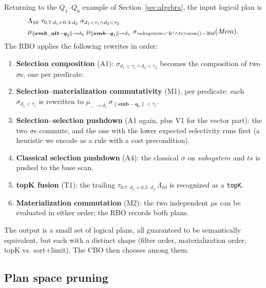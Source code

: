 \documentclass[sigconf,nonacm,review]{acmart}
\theoremstyle{plain}
\theoremstyle{definition}
\newcommand{\vect}[1]{\boldsymbol{#1}}
\newcommand{\Mem}{\mathit{Mem}}
\theoremstyle{remark}
\begin{document}
Returning to the $Q_1$--$Q_6$ example of
Section~\ref{sec:algebra}, the input logical plan is
\[
\begin{aligned}
& \Lambda_{10}\;
  \tau_{0.7\cdot d_1 + 0.3\cdot d_2}\;
  \sigma_{d_1<\tau_1 \wedge d_2<\tau_2}\; \\
& \mu_{\lVert\vect{emb\_alt}-\vect{q}_2\rVert\to d_2}\;
  \mu_{\lVert\vect{emb}-\vect{q}_1\rVert\to d_1}\;
  \sigma_{\mathit{subsystem}=\mathrm{`ft'} \wedge
  \mathit{ts}>\mathrm{now}()-30d}(\Mem).
\end{aligned}
\]
The RBO applies the following rewrites in order:

\begin{enumerate}[leftmargin=*]
  \item \textbf{Selection composition} (A1):
    $\sigma_{d_1<\tau_1 \wedge d_2<\tau_2}$ becomes the composition of
    two $\sigma$s, one per predicate.
  \item \textbf{Selection--materialization commutativity} (M1), per
    predicate: each $\sigma_{d_1<\tau_1}$ is rewritten to
    $\mu_{\ldots\to d_1}\, \sigma_{\lVert\vect{emb}-\vect{q}_1\rVert<\tau_1}$.
  \item \textbf{Selection--selection pushdown} (A1 again, plus V1 for
    the vector part): the two $\sigma$s commute, and the one with
    the lower expected selectivity runs first (a heuristic we encode
    as a rule with a cost precondition).
  \item \textbf{Classical selection pushdown} (A4): the
    classical $\sigma$ on $\mathit{subsystem}$ and
    $\mathit{ts}$ is pushed to the base scan.
  \item \textbf{topK fusion} (T1): the trailing
    $\tau_{0.7\cdot d_1+0.3\cdot d_2}\, \Lambda_{10}$ is recognized
    as a \texttt{topK}.
  \item \textbf{Materialization commutation} (M2): the two
    independent $\mu$s can be evaluated in either order; the RBO
    records both plans.
\end{enumerate}

The output is a small set of logical plans, all guaranteed to be
semantically equivalent, but each with a distinct shape (filter
order, materialization order, topK vs. sort+limit). The CBO then
chooses among them.

\subsection{Plan space pruning}\label{sec:rbo:complexity}
\end{document}

